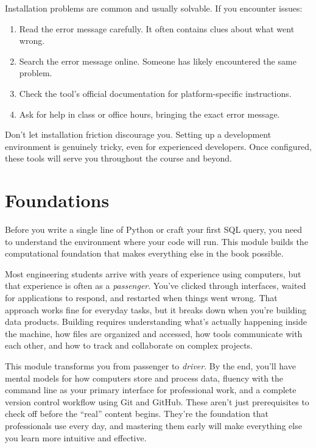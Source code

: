 \documentclass[
  letterpaper,
  DIV=11,
  numbers=noendperiod]{scrreprt}
\providecommand{\tightlist}{%
  \setlength{\itemsep}{0pt}\setlength{\parskip}{0pt}}
\begin{document}

Installation problems are common and usually solvable. If you encounter
issues:

\begin{enumerate}
\def\labelenumi{\arabic{enumi}.}
\tightlist
\item
  Read the error message carefully. It often contains clues about what
  went wrong.
\item
  Search the error message online. Someone has likely encountered the
  same problem.
\item
  Check the tool's official documentation for platform-specific
  instructions.
\item
  Ask for help in class or office hours, bringing the exact error
  message.
\end{enumerate}

Don't let installation friction discourage you. Setting up a development
environment is genuinely tricky, even for experienced developers. Once
configured, these tools will serve you throughout the course and beyond.

\part{Foundations}

Before you write a single line of Python or craft your first SQL query,
you need to understand the environment where your code will run. This
module builds the computational foundation that makes everything else in
the book possible.

Most engineering students arrive with years of experience using
computers, but that experience is often as a \emph{passenger}. You've
clicked through interfaces, waited for applications to respond, and
restarted when things went wrong. That approach works fine for everyday
tasks, but it breaks down when you're building data products. Building
requires understanding what's actually happening inside the machine, how
files are organized and accessed, how tools communicate with each other,
and how to track and collaborate on complex projects.

This module transforms you from passenger to \emph{driver}. By the end,
you'll have mental models for how computers store and process data,
fluency with the command line as your primary interface for professional
work, and a complete version control workflow using Git and GitHub.
These aren't just prerequisites to check off before the ``real'' content
begins. They're the foundation that professionals use every day, and
mastering them early will make everything else you learn more intuitive
and effective.
\end{document}
